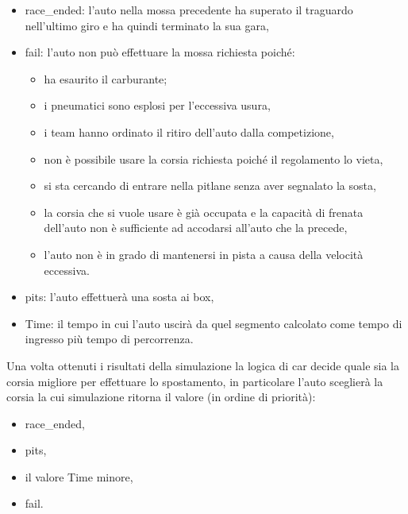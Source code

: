 \documentclass[11pt,a4paper]{report}
\begin{document}
\begin{itemize}
\item race\_ended: l'auto nella mossa precedente ha superato il traguardo nell'ultimo giro e ha quindi terminato la sua gara,
\item fail: l'auto non può effettuare la mossa richiesta poiché:
  \begin{itemize}
  \item ha esaurito il carburante;
  \item i pneumatici sono esplosi per l'eccessiva usura,
  \item i team hanno ordinato il ritiro dell'auto dalla competizione,
  \item non è possibile usare la corsia richiesta poiché il regolamento lo vieta,
  \item si sta cercando di entrare nella pitlane senza aver segnalato la sosta,
  \item la corsia che si vuole usare è già occupata e la capacità di frenata dell'auto non è sufficiente ad accodarsi all'auto che la precede,
  \item l'auto non è in grado di mantenersi in pista a causa della velocità eccessiva.
  \end{itemize}
\item pits: l'auto effettuerà una sosta ai box,
\item Time: il tempo in cui l'auto uscirà da quel segmento calcolato come tempo di ingresso più tempo di percorrenza.
\end{itemize}
Una volta ottenuti i risultati della simulazione la logica di car decide quale sia la corsia migliore per effettuare lo spostamento, in particolare l'auto sceglierà la corsia la cui simulazione ritorna il valore (in ordine di priorità):
\begin{itemize}
\item race\_ended,
\item pits,
\item il valore Time minore,
\item fail.
\end{itemize}
\end{document}
